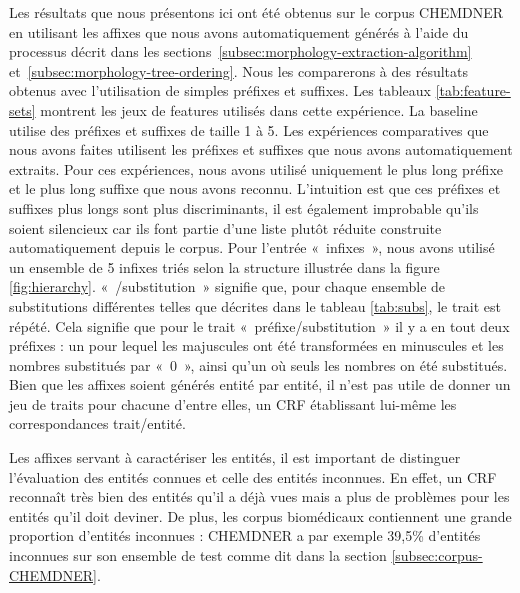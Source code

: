 \documentclass[PhD-Yoann-Dupont.tex]{subfiles}
\begin{document}
Les résultats que nous présentons ici ont été obtenus sur le corpus CHEMDNER en utilisant les affixes que nous avons automatiquement générés à l'aide du processus décrit dans les sections\ \ref{subsec:morphology-extraction-algorithm} et\ \ref{subsec:morphology-tree-ordering}. Nous les comparerons à des résultats obtenus avec l'utilisation de simples préfixes et suffixes. Les tableaux \ref{tab:feature-sets} montrent les jeux de features utilisés dans cette expérience. La baseline utilise des préfixes et suffixes de taille 1 à 5. Les expériences comparatives que nous avons faites utilisent les préfixes et suffixes que nous avons automatiquement extraits. Pour ces expériences, nous avons utilisé uniquement le plus long préfixe et le plus long suffixe que nous avons reconnu. L'intuition est que ces préfixes et suffixes plus longs sont plus discriminants, il est également improbable qu'ils soient silencieux car ils font partie d'une liste plutôt réduite construite automatiquement depuis le corpus. Pour l'entrée «\ infixes\ », nous avons utilisé un ensemble de 5 infixes triés selon la structure illustrée dans la figure \ref{fig:hierarchy}. «\ /substitution\ » signifie que, pour chaque ensemble de substitutions différentes telles que décrites dans le tableau \ref{tab:subs}, le trait est répété. Cela signifie que pour le trait «\ préfixe/substitution\ » il y a en tout deux préfixes : un pour lequel les majuscules ont été transformées en minuscules et les nombres substitués par «\ 0\ », ainsi qu'un où seuls les nombres on été substitués. Bien que les affixes soient générés entité par entité, il n'est pas utile de donner un jeu de traits pour chacune d'entre elles, un CRF établissant lui-même les correspondances trait/entité.

Les affixes servant à caractériser les entités, il est important de distinguer l'évaluation des entités connues et celle des entités inconnues. En effet, un CRF reconnaît très bien des entités qu'il a déjà vues mais a plus de problèmes pour les entités qu'il doit deviner. De plus, les corpus biomédicaux contiennent une grande proportion d'entités inconnues : CHEMDNER a par exemple 39,5\% d'entités inconnues sur son ensemble de test comme dit dans la section \ref{subsec:corpus-CHEMDNER}.
\end{document}
